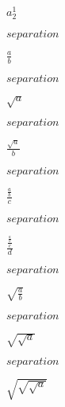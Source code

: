 

$a^1_2$

$separation$

$\frac{a}{b}$

$separation$

$\sqrt{a}$

$separation$

$\frac{\sqrt{a}}{b}$

$separation$

$\frac{\frac{a}{b}}{c}$

$separation$

$\frac{\frac{\frac{a}{b}}{c}}{d}$

$separation$

$\sqrt{\frac{a}{b}}$

$separation$

$\sqrt{\sqrt{a}}$

$separation$

$\sqrt{\sqrt{\sqrt{a}}}$

